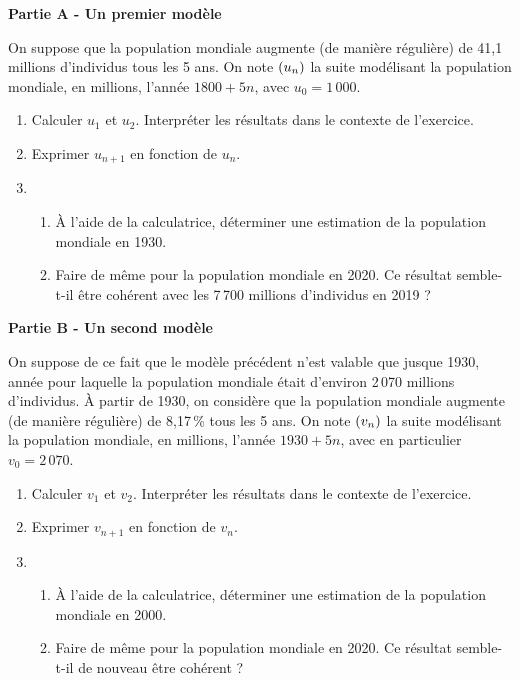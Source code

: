 \documentclass[a4paper,11pt]{article}
\begin{document}
\smallskip

\textbf{Partie A - Un premier modèle}

\smallskip

On suppose que la population mondiale augmente (de manière régulière) de 41,1 millions d'individus tous les 5 ans. On note $\suiten$ la suite modélisant la population mondiale, en millions, l'année $1800+5n$, avec $u_0=1\,000$.
%
\begin{enumerate}
	\item Calculer $u_1$ et $u_2$. Interpréter les résultats dans le contexte de l'exercice.
	\item Exprimer $u_{n+1}$ en fonction de $u_n$.
	\item 
	\begin{enumerate}
		\item À l'aide de la calculatrice, déterminer une estimation de la population mondiale en 1930.
		\item Faire de même pour la population mondiale en 2020. Ce résultat semble-t-il être cohérent avec les 7\,700 millions d'individus en 2019 ?
	\end{enumerate}
\end{enumerate}

\textbf{Partie B - Un second modèle}

\smallskip

On suppose de ce fait que le modèle précédent n'est valable que jusque 1930, année pour laquelle la population mondiale était d'environ 2\,070 millions d'individus. À partir de 1930, on considère que la population mondiale augmente (de manière régulière) de 8,17\,\% tous les 5 ans. On note $\suiten[v]$ la suite modélisant la population mondiale, en millions, l'année $1930+5n$, avec en particulier $v_0=2\,070$.
%
\begin{enumerate}
	\item Calculer $v_1$ et $v_2$. Interpréter les résultats dans le contexte de l'exercice.
	\item Exprimer $v_{n+1}$ en fonction de $v_n$.
	\item 
	\begin{enumerate}
		\item À l'aide de la calculatrice, déterminer une estimation de la population mondiale en 2000.
		\item Faire de même pour la population mondiale en 2020. Ce résultat semble-t-il de nouveau être cohérent ?
	\end{enumerate}
\end{enumerate}
\end{document}
